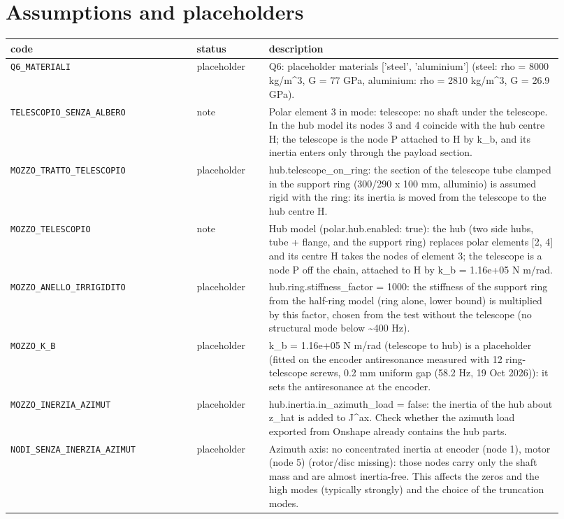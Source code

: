 \documentclass[10pt,a4paper]{article}
\numberwithin{equation}{section}
\begin{document}
\section{Assumptions and placeholders}\label{sec:assumptions}
\begin{longtable}{p{0.31\linewidth}p{0.12\linewidth}p{0.49\linewidth}}
\toprule code & status & description \\ \midrule\endhead
\texttt{Q6\_MATERIALI} & placeholder & Q6: placeholder materials ['steel', 'aluminium'] (steel: rho = 8000 kg/m\^{}3, G = 77 GPa, aluminium: rho = 2810 kg/m\^{}3, G = 26.9 GPa). \\
\texttt{TELESCOPIO\_SENZA\_ALBERO} & note & Polar element 3 in mode: telescope: no shaft under the telescope. In the hub model its nodes 3 and 4 coincide with the hub centre H; the telescope is the node P attached to H by k\_b, and its inertia enters only through the payload section. \\
\texttt{MOZZO\_TRATTO\_TELESCOPIO} & placeholder & hub.telescope\_on\_ring: the section of the telescope tube clamped in the support ring (300/290 x 100 mm, alluminio) is assumed rigid with the ring: its inertia is moved from the telescope to the hub centre H. \\
\texttt{MOZZO\_TELESCOPIO} & note & Hub model (polar.hub.enabled: true): the hub (two side hubs, tube + flange, and the support ring) replaces polar elements [2, 4] and its centre H takes the nodes of element 3; the telescope is a node P off the chain, attached to H by k\_b = 1.16e+05 N m/rad. \\
\texttt{MOZZO\_ANELLO\_IRRIGIDITO} & placeholder & hub.ring.stiffness\_factor = 1000: the stiffness of the support ring from the half-ring model (ring alone, lower bound) is multiplied by this factor, chosen from the test without the telescope (no structural mode below \textasciitilde{}400 Hz). \\
\texttt{MOZZO\_K\_B} & placeholder & k\_b = 1.16e+05 N m/rad (telescope to hub) is a placeholder (fitted on the encoder antiresonance measured with 12 ring-telescope screws, 0.2 mm uniform gap (58.2 Hz, 19 Oct 2026)): it sets the antiresonance at the encoder. \\
\texttt{MOZZO\_INERZIA\_AZIMUT} & placeholder & hub.inertia.in\_azimuth\_load = false: the inertia of the hub about z\_hat is added to J\^{}ax. Check whether the azimuth load exported from Onshape already contains the hub parts. \\
\texttt{NODI\_SENZA\_INERZIA\_AZIMUT} & placeholder & Azimuth axis: no concentrated inertia at encoder (node 1), motor (node 5) (rotor/disc missing): those nodes carry only the shaft mass and are almost inertia-free. This affects the zeros and the high modes (typically strongly) and the choice of the truncation modes. \\

\end{longtable}
\end{document}
